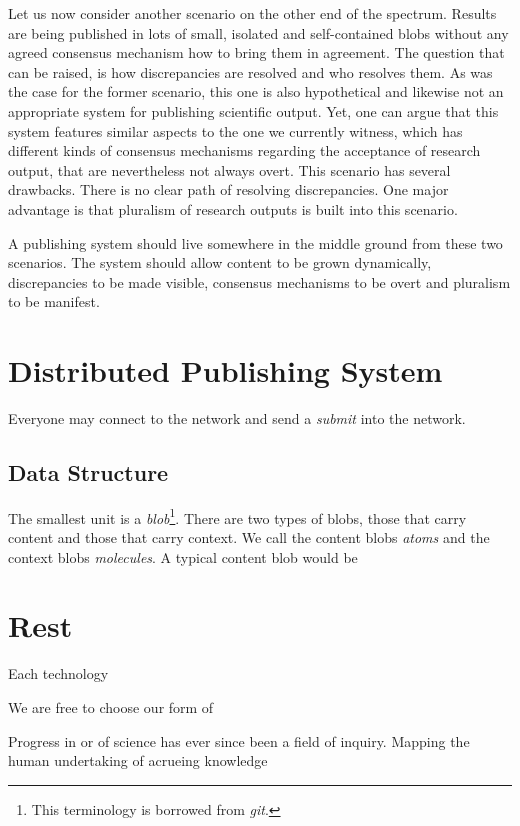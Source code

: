 \documentclass[14pt]{article}
\begin{document}
Let us now consider another scenario on the other end of the spectrum. Results are being published in lots of small, isolated and self-contained blobs without any agreed consensus mechanism  how to bring them in agreement. The question that can be raised, is how discrepancies are resolved and who resolves them. As was the case for the former scenario, this one is also hypothetical and likewise not an appropriate system for publishing scientific output. Yet, one can argue that this system features similar aspects to the one we currently witness, which has different kinds of consensus mechanisms regarding the acceptance of research output, that are nevertheless not always overt. 
This scenario has several drawbacks. There is no clear path of resolving discrepancies. One major advantage is that pluralism of research outputs is built into this scenario.  

A publishing system should live somewhere in the middle ground from these two scenarios. The system should allow content to be grown dynamically, discrepancies to be made visible, consensus mechanisms to be overt and pluralism to be manifest. %

\section{Distributed Publishing System}
Everyone may connect to the network and send a \textit{submit} into the network.

\subsection{Data Structure}

The smallest unit is a \textit{blob}\footnote{This terminology is borrowed from \textit{git}.}. There are two types of blobs, those that carry content and those that carry context. We call the content blobs \textit{atoms} and the context blobs \textit{molecules}. A typical content blob would be 



\section{Rest}

Each technology 


We are free to choose our form of 

Progress in or of science has ever since been a field of inquiry.
Mapping the human undertaking of acrueing knowledge 
\end{document}
